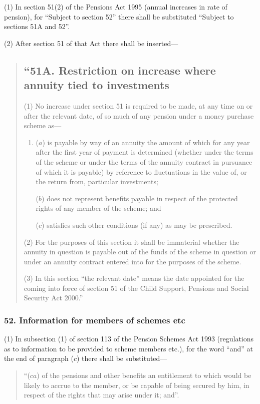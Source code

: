 \documentclass[12pt,a4paper]{article}
\begin{document}
(1) In section 51(2)  of the Pensions Act 1995 (annual increases in rate of pension), for “Subject to section 52” there shall be substituted “Subject to sections 51A and 52”.

(2) After section 51 of that Act there shall be inserted—
\begin{quotation}
\subsection*{“51A. Restriction on increase where annuity tied to investments}

(1) No increase under section 51 is required to be made, at any time on or after the relevant date, of so much of any pension under a money purchase scheme as—
\begin{enumerate}\item[]
($a$) is payable by way of an annuity the amount of which for any year after the first year of payment is determined (whether under the terms of the scheme or under the terms of the annuity contract in pursuance of which it is payable) by reference to fluctuations in the value of, or the return from, particular investments;

($b$) does not represent benefits payable in respect of the protected rights of any member of the scheme; and

($c$) satisfies such other conditions (if any) as may be prescribed.
\end{enumerate}

(2) For the purposes of this section it shall be immaterial whether the annuity in question is payable out of the funds of the scheme in question or under an annuity contract entered into for the purposes of the scheme.

(3) In this section “the relevant date” means the date appointed for the coming into force of section 51 of the Child Support, Pensions and Social Security Act 2000.”
\end{quotation}

\subsubsection{52. Information for members of schemes etc}

(1) In subsection (1)  of section 113 of the Pension Schemes Act 1993 (regulations as to information to be provided to scheme members etc.), for the word “and” at the end of paragraph ($c$)  there shall be substituted—
\begin{quotation}
“($ca$) of the pensions and other benefits an entitlement to which would be likely to accrue to the member, or be capable of being secured by him, in respect of the rights that may arise under it; and”.
\end{quotation}
\end{document}
